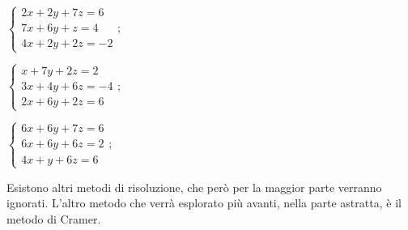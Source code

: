 \begin{exer}
    
    $
        \begin{cases}
            2x + 2y + 7z = 6 \\
            7x + 6y + z = 4 \\
            4x + 2y + 2z = -2
        \end{cases}
    $;

    $
        \begin{cases}
            x + 7y + 2z = 2 \\
            3x + 4y + 6z = -4 \\
            2x + 6y + 2z = 6
        \end{cases}
    $;

    $
        \begin{cases}
            6x + 6y + 7z = 6 \\
            6x + 6y + 6z = 2 \\
            4x + y + 6z = 6
        \end{cases}
    $;
\end{exer}

Esistono altri metodi di risoluzione, che però per la maggior parte verranno ignorati. L'altro metodo che verrà esplorato più avanti, nella parte astratta, è il metodo di Cramer.

